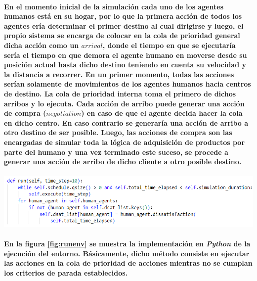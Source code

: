 \documentclass[12pt]{amsart}
\begin{document}
\paragraph{En el momento inicial de la simulación cada uno de los agentes humanos está en su hogar, por lo que la primera acción de todos los agentes ería determinar el primer destino al cual dirigirse y luego, el propio sistema se encarga de colocar en la cola de prioridad general dicha acción como un $arrival$, donde el tiempo en que se ejecutaría sería el tiempo en que demora el agente humano en moverse desde su posición actual hasta dicho destino teniendo en cuenta su velocidad y la distancia a recorrer. En un primer momento, todas las acciones serían solamente de movimientos de los agentes humanos hacia centros de destino. La cola de prioridad interna toma el primero de dichos arribos y lo ejecuta. Cada acción de arribo puede generar una acción de compra ($negotiation$) en caso de que el agente decida hacer la cola en dicho centro. En caso contrario se generaría una acción de arribo a otro destino de ser posible. Luego, las acciones de compra son las encargadas de simular toda la lógica de adquisición de productos por parte del humano y una vez terminado este suceso, se procede a generar una acción de arribo de dicho cliente a otro posible destino.}

\begin{center}
	\includegraphics[scale=0.7]{./images/runenv.png}
	\label{fig:runenv}
\end{center}

\paragraph{En la figura \ref{fig:runenv} se muestra la implementación en \textit{Python} de la ejecución del entorno. Básicamente, dicho método consiste en ejecutar las acciones en la cola de prioridad de acciones mientras no se cumplan los criterios de parada establecidos.}
\end{document}
